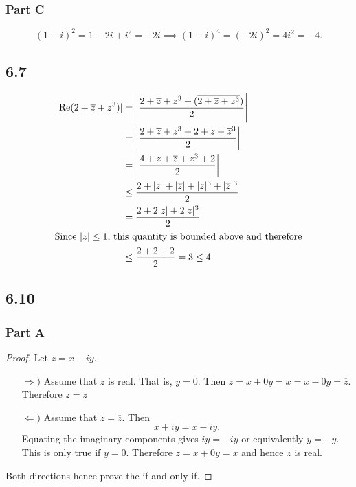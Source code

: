 \documentclass[12pt,titlepage]{extarticle}
\begin{document}
\subsubsection*{Part C}
\[
    (1-i)^2 = 1 - 2i + i^2 = -2i \implies (1-i)^4 = (-2i)^2 = 4i^2 = -4
.\]

\subsection*{6.7}
\begin{align*}
    |\Re(2+\overline{z} + z^3)| &= \qty|\frac{2 + \overline{z} + z^3 + (\overline{2 + \overline{z} + z^3})}{2}| \\
    &= \qty|\frac{2 + \overline{z} + z^3 + 2 + z + \overline{z}^3}{2}| \\
    &= \qty|\frac{4 + z + \overline{z} + z^3 + 2}{2}| \\
    &\leq \frac{2 + |z| + |\overline{z}| + |z|^3 + |\overline{z}|^3}{2} \\
    &= \frac{2 + 2|z| + 2|z|^3}{2} \\
\intertext{Since $|z| \leq 1$, this quantity is bounded above and therefore}
    &\leq \frac{2 + 2 + 2}{2} = 3 \leq 4
\end{align*}

\subsection*{6.10}
\subsubsection*{Part A}
\begin{proof}
    Let $z = x + iy$.
    \begin{enumerate}
        \item[$\Rightarrow)$]
            Assume that $z$ is real. That is, $y = 0$. Then $z = x + 0y = x = x - 0y = \overline{z}$. Therefore $z = \overline{z}$
        \item[$\Leftarrow)$]
            Assume that $z = \overline{z}$. Then
            \[
                x + iy = x - iy
            .\]
            Equating the imaginary components gives $iy = - iy$ or equivalently $y = -y$. This is only true if $y = 0$. Therefore $z = x + 0y = x$ and hence $z$ is real.
    \end{enumerate}
    Both directions hence prove the if and only if.
\end{proof}
\end{document}
